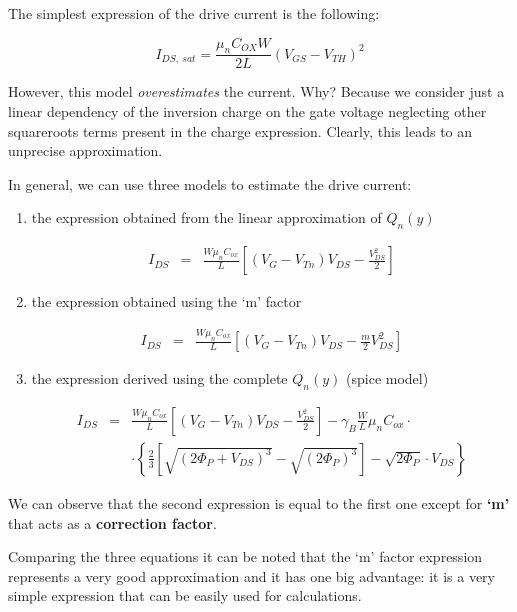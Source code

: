 \documentclass[a4paper, 12pt, twoside, openright]{report}
\begin{document}
{The simplest expression of the drive current is the following:

\begin{equation}
I_{DS,\ sat} = \frac{\mu_n C_{OX} W}{2L} (V_{GS} - V_{TH})^2
\label{}
\end{equation}

However, this model \emph{overestimates} the current. Why? Because we consider just a linear dependency of the inversion charge on the gate voltage neglecting other squareroots terms present in the charge expression. Clearly, this leads to an unprecise approximation.

In general, we can use three models to estimate the drive current:
\begin{enumerate}
\item the expression obtained from the linear approximation of $Q_{n}(y)$

	\begin{eqnarray*}
	 I_{DS} &=&\frac{W \mu_n C_{ox}}{L}\left[\left(V_G-V_{Tn}\right)V_{DS}-\frac{V_{DS}^2}{2}\right]
	\end{eqnarray*}

\item the expression obtained using the `m' factor

	\begin{eqnarray*}
	 I_{DS} &=&\frac{W \mu_n C_{ox}}{L}\left[\left(V_G-V_{Tn}\right)V_{DS}-\frac{ {m}}{2}V_{DS}^2\right]
	\end{eqnarray*}

\item the expression derived using the complete $Q_{n}(y)$ (spice model)

	\begin{eqnarray*}
	I_{DS} &=&\frac{W \mu_n C_{ox}}{L}\left[\left(V_G-V_{Tn}\right)V_{DS}-\frac{V_{DS}^2}{2}\right]
	        -\gamma_B \frac{W}{L}\mu_n C_{ox}\cdot\\
	        & &\cdot\left\{\frac{2}{3}\left[\sqrt{\left(2\Phi_P +V_{DS}\right)^3}
	            -\sqrt{\left(2\Phi_P\right)^3}\right]-\sqrt{2\Phi_P}\cdot V_{DS}\right\}
	\end{eqnarray*}

\end{enumerate}

We can observe that the second expression is equal to the first one except for \textbf{`m'} that acts as a \textbf{correction factor}.

Comparing the three equations it can be noted that the `m' factor expression represents a very good approximation and it has one big advantage: it is a very simple expression that can be easily used for calculations.


}
\end{document}
